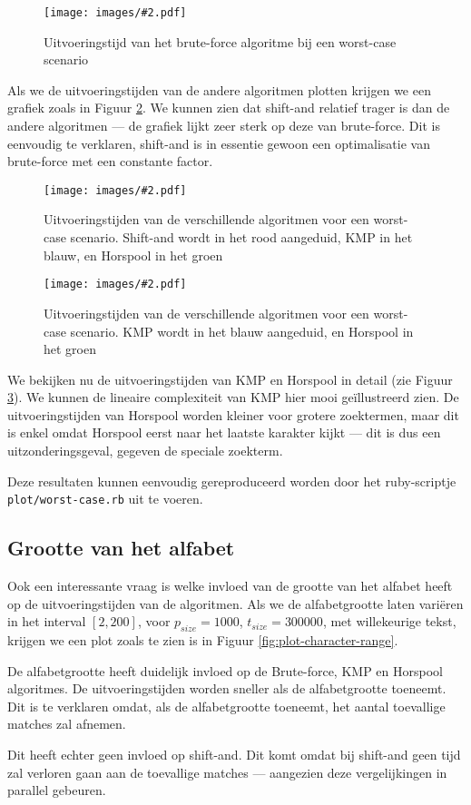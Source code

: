 \documentclass[a4paper,11pt]{article}
\newcommand{\image}[3][1]{
    \begin{figure}
    \begin{center}
    \texttt{[image: images/\#2.pdf]}
    \caption{#3}
    \label{fig:#2}
    \end{center}
    \end{figure}
}
\newcommand{\reproduce}[1]{
    Deze resultaten kunnen eenvoudig gereproduceerd worden door het
    ruby-scriptje \texttt{#1} uit te voeren.
}
\begin{document}
\image{plot-worst-case-brute-force}{Uitvoeringstijd van het brute-force
algoritme bij een worst-case scenario}

Als we de uitvoeringstijden van de andere algoritmen plotten krijgen we een
grafiek zoals in Figuur \ref{fig:plot-worst-case}. We kunnen zien dat shift-and
relatief trager is dan de andere algoritmen — de grafiek lijkt zeer sterk op
deze van brute-force. Dit is eenvoudig te verklaren, shift-and is in essentie
gewoon een optimalisatie van brute-force met een constante factor.

\image{plot-worst-case}{Uitvoeringstijden van de verschillende algoritmen voor
een worst-case scenario. Shift-and wordt in het rood aangeduid, KMP in het
blauw, en Horspool in het groen}

\image{plot-worst-case-detail}{Uitvoeringstijden van de verschillende algoritmen
voor een worst-case scenario. KMP wordt in het blauw aangeduid, en Horspool in
het groen}

We bekijken nu de uitvoeringstijden van KMP en Horspool in detail (zie Figuur
\ref{fig:plot-worst-case-detail}). We kunnen de lineaire complexiteit van KMP
hier mooi ge\"illustreerd zien. De uitvoeringstijden van Horspool worden kleiner
voor grotere zoektermen, maar dit is enkel omdat Horspool eerst naar het laatste
karakter kijkt — dit is dus een uitzonderingsgeval, gegeven de speciale
zoekterm.

\reproduce{plot/worst-case.rb}

\subsection{Grootte van het alfabet}

Ook een interessante vraag is welke invloed van de grootte van het alfabet
heeft op de uitvoeringstijden van de algoritmen. Als we de alfabetgrootte laten
vari\"eren in het interval $[2, 200]$, voor $p_{size} = 1000$, $t_{size} =
300000$, met willekeurige tekst, krijgen we een plot zoals te zien is in Figuur
\ref{fig:plot-character-range}.

De alfabetgrootte heeft duidelijk invloed op de Brute-force, KMP en Horspool
algoritmes. De uitvoeringstijden worden sneller als de alfabetgrootte toeneemt.
Dit is te verklaren omdat, als de alfabetgrootte toeneemt, het aantal toevallige
matches zal afnemen.

Dit heeft echter geen invloed op shift-and. Dit komt omdat bij shift-and geen
tijd zal verloren gaan aan de toevallige matches — aangezien deze vergelijkingen
in parallel gebeuren.
\end{document}
